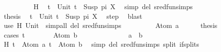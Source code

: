 \begin{isabellebody}
\ \ \ \ \ \ \ \ \isamarkupfalse%
\ H\ \isamarkupfalse%
\ {\isacartoucheopen}t{}\ {\isacharequal}{\kern0pt}\ Unit{\isacartoucheclose}\ {\isacartoucheopen}t{}\ {\isacharequal}{\kern0pt}\ Susp\ pi\ X{\isacartoucheclose}\ \isamarkupfalse%
\ {\isacharparenleft}{\kern0pt}simp\ del{\isacharcolon}{\kern0pt}\ sred{\isacharunderscore}{\kern0pt}fun{\isachardot}{\kern0pt}simps{\isacharparenright}{\kern0pt}\isanewline
\ \ \ \ \ \ \isamarkupfalse%
\ \isamarkupfalse%
\ {\isacharquery}{\kern0pt}thesis\ \isamarkupfalse%
\ {\isacartoucheopen}t{}\ {\isacharequal}{\kern0pt}\ Unit{\isacartoucheclose}\ {\isacartoucheopen}t{}\ {\isacharequal}{\kern0pt}\ Susp\ pi\ X{\isacartoucheclose}\ \isamarkupfalse%
\ step\ \isamarkupfalse%
\ blast\isanewline
\ \ \ \ \isamarkupfalse%
\ {\isacharparenleft}{\kern0pt}use\ H\ Unit\ \ {\isacartoucheopen}simp{\isacharunderscore}{\kern0pt}all\ del{\isacharcolon}{\kern0pt}\ sred{\isacharunderscore}{\kern0pt}fun{\isachardot}{\kern0pt}simps{\isacartoucheclose}{\isacharparenright}{\kern0pt}\ %
\isanewline
\ \ \isamarkupfalse%
\isanewline
\ \ \ \ \isamarkupfalse%
\ {\isacharparenleft}{\kern0pt}Atom\ a{\isacharparenright}{\kern0pt}\isanewline
\ \ \ \ \isamarkupfalse%
\ {\isacharquery}{\kern0pt}thesis\isanewline
\ \ \ \ \isamarkupfalse%
\ {\isacharparenleft}{\kern0pt}cases\ t{}{\isacharparenright}{\kern0pt}\isanewline
\ \ \ \ \ \ \isamarkupfalse%
\ {\isacharparenleft}{\kern0pt}Atom\ b{\isacharparenright}{\kern0pt}\isanewline
\ \ \ \ \ \ %
\isanewline
\ \ \ \ \ \ \isamarkupfalse%
\ {\isachardoublequoteopen}a\ {\isacharequal}{\kern0pt}\ b{\isachardoublequoteclose}\isanewline
\ \ \ \ \ \ \ \ \isamarkupfalse%
\ H\ {\isacartoucheopen}t{}\ {\isacharequal}{\kern0pt}\ Atom\ a{\isacartoucheclose}\ {\isacartoucheopen}t{}\ {\isacharequal}{\kern0pt}\ Atom\ b{\isacartoucheclose}\ \isamarkupfalse%
\ {\isacharparenleft}{\kern0pt}simp\ del{\isacharcolon}{\kern0pt}\ sred{\isacharunderscore}{\kern0pt}fun{\isachardot}{\kern0pt}simps\ split{\isacharcolon}{\kern0pt}\ if{\isacharunderscore}{\kern0pt}splits{\isacharparenright}{\kern0pt}\isanewline

\end{isabellebody}
